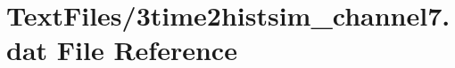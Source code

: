 \hypertarget{3time2histsim__channel7_8dat}{}\section{Text\+Files/3time2histsim\+\_\+channel7.dat File Reference}
\label{3time2histsim__channel7_8dat}
